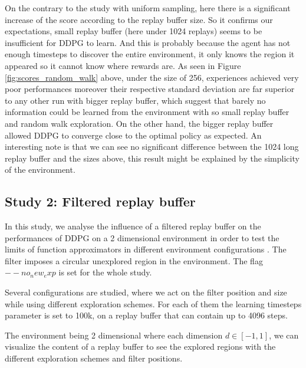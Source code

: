 \documentclass{article}
\begin{document}
On the contrary to the study with uniform sampling, here there is a significant increase of the score according to the replay buffer size. So it confirms our expectations, small replay buffer (here under 1024 replays) seems to be insufficient for DDPG to learn. And this is probably because the agent has not enough timesteps to discover the entire environment, it only knows the region it appeared so it cannot know where rewards are. As seen in Figure \ref{fig:scores_random_walk} above, under the size of 256, experiences achieved very poor performances moreover their respective standard deviation are far superior to any other run with bigger replay buffer, which suggest that barely no information could be learned from the environment with so small replay buffer and random walk exploration. On the other hand, the bigger replay buffer allowed DDPG to converge close to the optimal policy as expected. An interesting note is that we can see no significant difference between the 1024 long replay buffer and the sizes above, this result might be explained by the simplicity of the environment.


\subsection{Study 2: Filtered replay buffer}

In this study, we analyse the influence of a filtered replay buffer on the performances of DDPG on a 2 dimensional environment in order to test the limits of function approximators  in different environment configurations \cite{schaul_universal_2015}. The filter imposes a circular unexplored region in the environment. The flag $--no_new_exp$ is set for the whole study.

Several configurations are studied, where we act on the filter position and size while using different exploration schemes. For each of them the learning timesteps parameter is set to 100k, on a replay buffer that can contain up to 4096 steps.

The environment being 2 dimensional where each dimension $d\in[-1,1]$, we can visualize the content of a replay buffer to see the explored regions with the different exploration schemes and filter positions.
\end{document}
